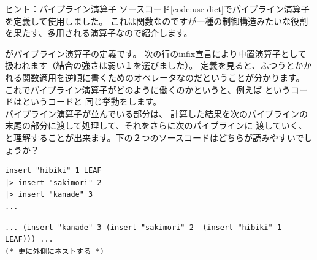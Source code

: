 \documentclass[11pt,a4paper]{article}
\begin{document}
\begin{itembox}[l]{ヒント：パイプライン演算子}
ソースコード\ref{code:use-dict}でパイプライン演算子を定義して使用しました。
これは関数なのですが一種の制御構造みたいな役割を果たす、多用される演算子なので紹介します。

がパイプライン演算子\prog{|>}の定義です。
次の行のinfix宣言により中置演算子として扱われます（結合の強さは弱い１を選びました）。
定義を見ると、ふつうとかかれる関数適用を逆順に書くためのオペレータなのだということが分かります。
これでパイプライン演算子がどのように働くのかというと、例えば
というコードはというコードと
同じ挙動をします。\\
パイプライン演算子が並んでいる部分は、
計算した結果を次のパイプラインの末尾の部分に渡して処理して、それをさらに次のパイプラインに
渡していく、と理解することが出来ます。下の２つのソースコードはどちらが読みやすいでしょうか？

\begin{lstlisting}
insert "hibiki" 1 LEAF
|> insert "sakimori" 2
|> insert "kanade" 3
...
\end{lstlisting}

\begin{lstlisting}
... (insert "kanade" 3 (insert "sakimori" 2  (insert "hibiki" 1 LEAF))) ...
(* 更に外側にネストする *)
\end{lstlisting}

\end{itembox}
\end{document}
